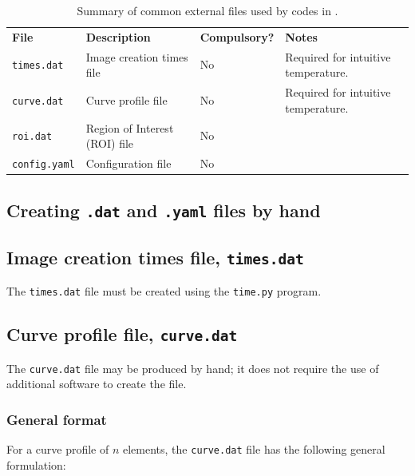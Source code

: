 \begin{table}[H]
	\begin{center}
		\begin{tabular}{l l l l}
			\hline
			\textbf{File}	&	\textbf{Description}	&	\textbf{Compulsory?} & \textbf{Notes}\\
			\texttt{times.dat}	& Image creation times file	&	No	&	Required for intuitive temperature.	\\
			\texttt{curve.dat}	& Curve profile file	&	No	&	Required for intuitive temperature.	\\
			\texttt{roi.dat}	& Region of Interest (ROI) file	&	No	&	\\
			\texttt{config.yaml}	& Configuration file	&	No	&	\\
			\hline
		\end{tabular}
	\end{center}
	\caption[External files summary.]{\label{tab:ext_files:overview}%
		Summary of common external files used by codes in \labtools{}.%
	}
\end{table}

\subsection{Creating \texttt{.dat} and \texttt{.yaml} files by hand}



\subsection{Image creation times file, \texttt{times.dat}}
The \texttt{times.dat} file must be created using the \texttt{time.py} program.

\subsection{Curve profile file, \texttt{curve.dat}}\label{ssec:ext_files:curve}
The \texttt{curve.dat} file may be produced by hand; it does not require the use of additional software to create the file. 

\subsubsection{General format}
For a curve profile of $ n $ elements, the \texttt{curve.dat} file has the following general formulation:


